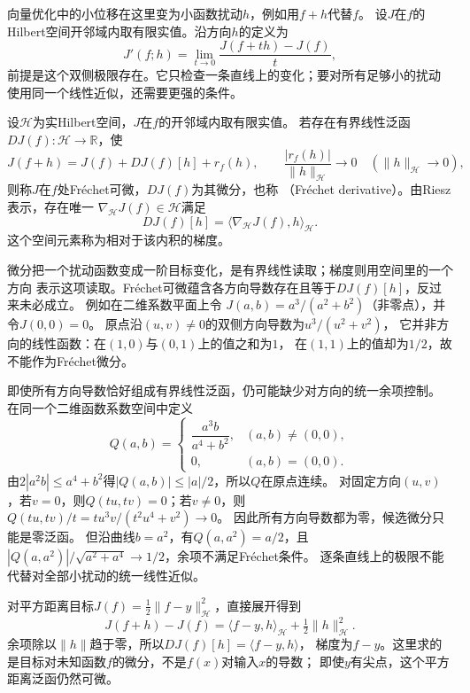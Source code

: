 向量优化中的小位移在这里变为小函数扰动$h$，例如用$f+h$代替$f$。
设$J$在$f$的Hilbert空间开邻域内取有限实值。沿方向$h$的定义为
\[
 J'(f;h)=\lim_{t\to0}\frac{J(f+th)-J(f)}{t},
\]
前提是这个双侧极限存在。它只检查一条直线上的变化；要对所有足够小的扰动
使用同一个线性近似，还需要更强的条件。

\begin{definition}[函数泛函的Fréchet微分与梯度]
\label{def:functional-frechet-gradient}
设$\mathcal H$为实Hilbert空间，$J$在$f$的开邻域内取有限实值。
若存在有界线性泛函$DJ(f):\mathcal H\to\mathbb R$，使
\[
 J(f+h)=J(f)+DJ(f)[h]+r_f(h),\qquad
 \frac{|r_f(h)|}{\lVert h\rVert_{\mathcal H}}\longrightarrow0
 \quad(\lVert h\rVert_{\mathcal H}\to0),
\]
则称$J$在$f$处Fréchet可微，$DJ(f)$为其微分，也称
（Fréchet derivative）。由Riesz表示，存在唯一
$\nabla_{\mathcal H}J(f)\in\mathcal H$满足
\[
 DJ(f)[h]=\langle\nabla_{\mathcal H}J(f),h\rangle_{\mathcal H}.
\]
这个空间元素称为相对于该内积的梯度。
\end{definition}
微分把一个扰动函数变成一阶目标变化，是有界线性读取；梯度则用空间里的一个方向
表示这项读取。Fréchet可微蕴含各方向导数存在且等于$DJ(f)[h]$，反过来未必成立。
例如在二维系数平面上令
$J(a,b)=a^3/(a^2+b^2)$（非零点），并令$J(0,0)=0$。
原点沿$(u,v)\neq0$的双侧方向导数为$u^3/(u^2+v^2)$，
它并非方向的线性函数：在$(1,0)$与$(0,1)$上的值之和为$1$，
在$(1,1)$上的值却为$1/2$，故不能作为Fréchet微分。

即使所有方向导数恰好组成有界线性泛函，仍可能缺少对方向的统一余项控制。
在同一个二维函数系数空间中定义
\[
 Q(a,b)=
 \begin{cases}
  \dfrac{a^3b}{a^4+b^2},&(a,b)\neq(0,0),\\
  0,&(a,b)=(0,0).
 \end{cases}
\]
由$2|a^2b|\leq a^4+b^2$得$|Q(a,b)|\leq|a|/2$，所以$Q$在原点连续。
对固定方向$(u,v)$，若$v=0$，则$Q(tu,tv)=0$；若$v\neq0$，则
$Q(tu,tv)/t=t u^3v/(t^2u^4+v^2)\to0$。
因此所有方向导数都为零，候选微分只能是零泛函。
但沿曲线$b=a^2$，有$Q(a,a^2)=a/2$，且
$|Q(a,a^2)|/\sqrt{a^2+a^4}\to1/2$，余项不满足Fréchet条件。
逐条直线上的极限不能代替对全部小扰动的统一线性近似。

对平方距离目标$J(f)=\frac12\lVert f-y\rVert_{\mathcal H}^2$，直接展开得到
\[
 J(f+h)-J(f)
 =\langle f-y,h\rangle_{\mathcal H}+\tfrac12\lVert h\rVert_{\mathcal H}^2.
\]
余项除以$\lVert h\rVert$趋于零，所以$DJ(f)[h]=\langle f-y,h\rangle$，
梯度为$f-y$。这里求的是目标对未知函数$f$的微分，不是$f(x)$对输入$x$的导数；
即使$y$有尖点，这个平方距离泛函仍然可微。

